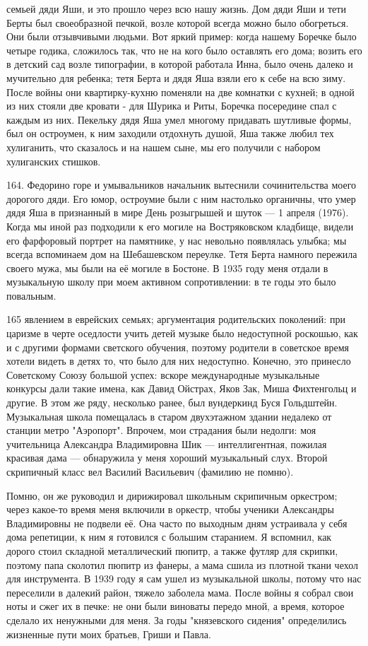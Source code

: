 \label{163-1}
семьей дяди Яши, и это прошло через всю нашу жизнь. Дом дяди Яши и тети Берты был своеобразной печкой, возле которой всегда можно было обогреться. Они были отзывчивыми людьми. Вот яркий пример: когда нашему Боречке было четыре годика, сложилось так, что не на кого было оставлять его дома; возить его в детский сад возле типографии, в которой работала Инна, было очень далеко и мучительно для ребенка; тетя Берта и дядя Яша взяли его к себе на всю зиму. После войны они квартирку-кухню поменяли на две комнатки с кухней; в одной из них стояли две кровати - для Шурика и Риты, Боречка посередине спал с каждым из них. Пекельку дядя Яша умел многому придавать шутливые формы, был он остроумен, к ним заходили отдохнуть душой, Яша также любил тех хулиганить, что сказалось и на нашем сыне, мы его получили с набором хулиганских стишков.

\label{164-1}
164. Федорино горе и умывальников начальник вытеснили сочинительства моего дорогого дяди. Его юмор, остроумие были с ним настолько органичны, что умер дядя Яша в признанный в мире День розыгрышей и шуток — 1 апреля (1976). Когда мы иной раз подходили к его могиле на Востряковском кладбище, видели его фарфоровый портрет на памятнике, у нас невольно появлялась улыбка; мы всегда вспоминаем дом на Шебашевском переулке. Тетя Берта намного пережила своего мужа, мы были на её могиле в Бостоне. В 1935 году меня отдали в музыкальную школу при моем активном сопротивлении: в те годы это было повальным.

\label{165-1}
165 явлением в еврейских семьях; аргументация родительских поколений: при царизме в черте оседлости учить детей музыке было недоступной роскошью, как и с другими формами светского обучения, поэтому родители в советское время хотели видеть в детях то, что было для них недоступно. Конечно, это принесло Советскому Союзу большой успех: вскоре международные музыкальные конкурсы дали такие имена, как Давид Ойстрах, Яков Зак, Миша Фихтенгольц и другие. В этом же ряду, несколько ранее, был вундеркинд Буся Гольдштейн. Музыкальная школа помещалась в старом двухэтажном здании недалеко от станции метро "Аэропорт". Впрочем, мои страдания были недолги: моя учительница Александра Владимировна Шик — интеллигентная, пожилая красивая дама — обнаружила у меня хороший музыкальный слух. Второй скрипичный класс вел Василий Васильевич (фамилию не помню).

\label{166-1}
Помню, он же руководил и дирижировал школьным скрипичным оркестром; через какое-то время меня включили в оркестр, чтобы ученики Александры Владимировны не подвели её. Она часто по выходным дням устраивала у себя дома репетиции, к ним я готовился с большим старанием.
Я вспомнил, как дорого стоил складной металлический пюпитр, а также футляр для скрипки, поэтому папа сколотил пюпитр из фанеры, а мама сшила из плотной ткани чехол для инструмента.
В 1939 году я сам ушел из музыкальной школы, потому что нас переселили в далекий район, тяжело заболела мама. После войны я собрал свои ноты и сжег их в печке: не они были виноваты передо мной, а время, которое сделало их ненужными для меня.
За годы "князевского сидения" определились жизненные пути моих братьев, Гриши и Павла.

